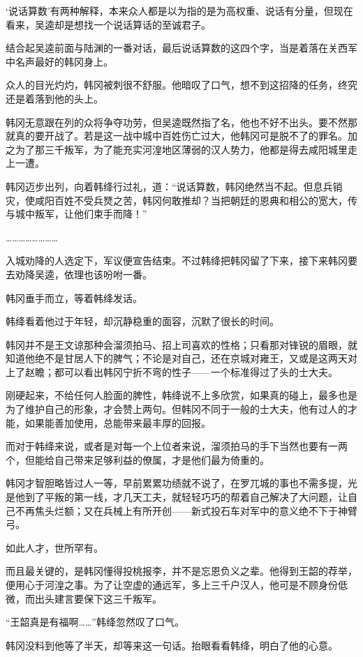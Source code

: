 ‘说话算数’有两种解释，本来众人都是以为指的是为高权重、说话有分量，但现在看来，吴逵却是想找一个说话算话的至诚君子。

结合起吴逵前面与陆渊的一番对话，最后说话算数的这四个字，当是着落在关西军中名声最好的韩冈身上。

众人的目光灼灼，韩冈被刺很不舒服。他暗叹了口气，想不到这招降的任务，终究还是着落到他的头上。

韩冈无意跟在列的众将争夺功劳，但吴逵既然指了名，他也不好不出头。要不然那就真的要开战了。若是这一战中城中百姓伤亡过大，他韩冈可是脱不了的罪名。加之为了那三千叛军，为了能充实河湟地区薄弱的汉人势力，他都是得去咸阳城里走上一遭。

韩冈迈步出列，向着韩绛行过礼，道：“说话算数，韩冈绝然当不起。但息兵销灾，使咸阳百姓不受兵燹之苦，韩冈何敢推却？当把朝廷的恩典和相公的宽大，传与城中叛军，让他们束手而降！”

……………………

入城劝降的人选定下，军议便宣告结束。不过韩绛把韩冈留了下来，接下来韩冈要去劝降吴逵，依理也该吩咐一番。

韩冈垂手而立，等着韩绛发话。

韩绛看着他过于年轻，却沉静稳重的面容，沉默了很长的时间。

韩冈并不是王文谅那种会溜须拍马、招上司喜欢的性格；只看那对锋锐的眉眼，就知道他绝不是甘居人下的脾气；不论是对自己，还在京城对雍王，又或是这两天对上了赵瞻；都可以看出韩冈宁折不弯的性子——一个标准得过了头的士大夫。

刚硬起来，不给任何人脸面的脾性，韩绛说不上多欣赏，如果真的碰上，最多也是为了维护自己的形象，才会赞上两句。但韩冈不同于一般的士大夫，他有过人的才能，如果能善加使用，总能带来最丰厚的回报。

而对于韩绛来说，或者是对每一个上位者来说，溜须拍马的手下当然也要有一两个，但能给自己带来足够利益的僚属，才是他们最为倚重的。

韩冈才智胆略皆过人一等，早前累累功绩就不说了，在罗兀城的事也不需多提，光是他到了平叛的第一线，才几天工夫，就轻轻巧巧的帮着自己解决了大问题，让自己不再焦头烂额；又在兵械上有所开创——新式投石车对军中的意义绝不下于神臂弓。

如此人才，世所罕有。

而且最关键的，是韩冈懂得投桃报李，并不是忘恩负义之辈。他得到王韶的荐举，便用心于河湟之事。为了让空虚的通远军，多上三千户汉人，他可是不顾身份低微，而出头建言要保下这三千叛军。

“王韶真是有福啊……”韩绛忽然叹了口气。

韩冈没料到他等了半天，却等来这一句话。抬眼看看韩绛，明白了他的心意。

